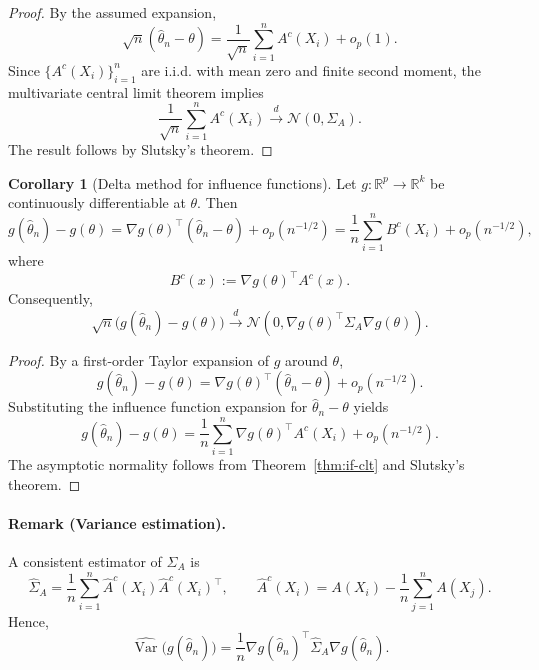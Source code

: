 \documentclass[11pt]{article}
\theoremstyle{definition}
\newtheorem{corollary}{Corollary}[section]
\begin{document}
\begin{proof}
By the assumed expansion,
\[
\sqrt{n}(\hat\theta_n - \theta)
=
\frac{1}{\sqrt{n}}\sum_{i=1}^n A^c(X_i) + o_p(1).
\]
Since $\{A^c(X_i)\}_{i=1}^n$ are i.i.d. with mean zero and finite second moment,
the multivariate central limit theorem implies
\[
\frac{1}{\sqrt{n}}\sum_{i=1}^n A^c(X_i)
\xrightarrow{d}
\mathcal{N}(0, \Sigma_A).
\]
The result follows by Slutsky's theorem.
\end{proof}

\begin{corollary}[Delta method for influence functions]
\label{cor:if-delta}
Let $g:\mathbb{R}^p \to \mathbb{R}^k$ be continuously differentiable at $\theta$.
Then
\[
g(\hat\theta_n) - g(\theta)
=
\nabla g(\theta)^\top (\hat\theta_n - \theta) + o_p(n^{-1/2})
=
\frac{1}{n}\sum_{i=1}^n B^c(X_i) + o_p(n^{-1/2}),
\]
where
\[
B^c(x) := \nabla g(\theta)^\top A^c(x).
\]
Consequently,
\[
\sqrt{n}\big(g(\hat\theta_n) - g(\theta)\big)
\xrightarrow{d}
\mathcal{N}\!\left(0, \nabla g(\theta)^\top \Sigma_A \nabla g(\theta)\right).
\]
\end{corollary}

\begin{proof}
By a first-order Taylor expansion of $g$ around $\theta$,
\[
g(\hat\theta_n) - g(\theta)
=
\nabla g(\theta)^\top (\hat\theta_n - \theta) + o_p(n^{-1/2}).
\]
Substituting the influence function expansion for $\hat\theta_n - \theta$ yields
\[
g(\hat\theta_n) - g(\theta)
=
\frac{1}{n}\sum_{i=1}^n \nabla g(\theta)^\top A^c(X_i) + o_p(n^{-1/2}).
\]
The asymptotic normality follows from Theorem~\ref{thm:if-clt} and Slutsky's theorem.
\end{proof}

\paragraph{Remark (Variance estimation).}
A consistent estimator of $\Sigma_A$ is
\[
\hat\Sigma_A
=
\frac{1}{n}\sum_{i=1}^n \hat A^c(X_i)\hat A^c(X_i)^\top,
\qquad
\hat A^c(X_i)
=
A(X_i) - \frac{1}{n}\sum_{j=1}^n A(X_j).
\]
Hence,
\[
\widehat{\operatorname{Var}}\!\big(g(\hat\theta_n)\big)
=
\frac{1}{n}
\nabla g(\hat\theta_n)^\top
\hat\Sigma_A
\nabla g(\hat\theta_n).
\]
\end{document}
